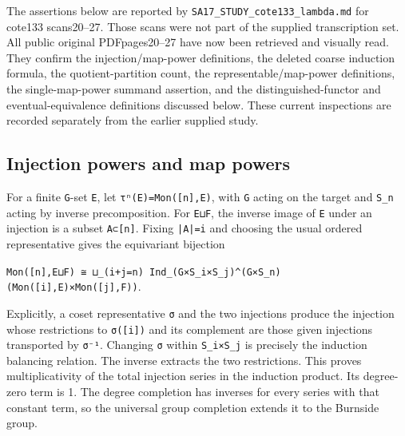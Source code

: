 \documentclass[
  10pt,
]{article}
\begin{document}
The assertions below are reported by
\texttt{\small SA17\_\allowbreak{}STUDY\_\allowbreak{}cote133\_\allowbreak{}lambda.md}
for cote133 scans20--27. Those scans were not part of the supplied
transcription set. All public original PDFpages20--27 have now been
retrieved and visually read. They confirm the injection/map-power
definitions, the deleted coarse induction formula, the
quotient-partition count, the representable/map-power definitions, the
single-map-power summand assertion, and the distinguished-functor and
eventual-equivalence definitions discussed below. These current
inspections are recorded separately from the earlier supplied study.

\subsection{Injection powers and map
powers}\label{injection-powers-and-map-powers}

For a finite \texttt{\small G}-set \texttt{\small E}, let
\texttt{\small τⁿ(\allowbreak{}E)\allowbreak{}=\allowbreak{}Mon(\allowbreak{}[\allowbreak{}n]\allowbreak{},\allowbreak{}E)\allowbreak{}},
with \texttt{\small G} acting on the target and
\texttt{\small S\_\allowbreak{}n} acting by inverse precomposition. For
\texttt{\small E⊔F}, the inverse image of \texttt{\small E} under an
injection is a subset \texttt{\small A⊂[\allowbreak{}n]\allowbreak{}}.
Fixing \texttt{\small |A|=\allowbreak{}i} and choosing the usual ordered
representative gives the equivariant bijection

\texttt{\small Mon(\allowbreak{}[\allowbreak{}n]\allowbreak{},\allowbreak{}E⊔F)\allowbreak{} ≅ ⊔\_\allowbreak{}(\allowbreak{}i+\allowbreak{}j=\allowbreak{}n)\allowbreak{} Ind\_\allowbreak{}(\allowbreak{}G×S\_\allowbreak{}i×S\_\allowbreak{}j)\allowbreak{}\textasciicircum{}(\allowbreak{}G×S\_\allowbreak{}n)\allowbreak{}(\allowbreak{}Mon(\allowbreak{}[\allowbreak{}i]\allowbreak{},\allowbreak{}E)\allowbreak{}×Mon(\allowbreak{}[\allowbreak{}j]\allowbreak{},\allowbreak{}F)\allowbreak{})\allowbreak{}}.

Explicitly, a coset representative \texttt{\small σ} and the two
injections produce the injection whose restrictions to
\texttt{\small σ(\allowbreak{}[\allowbreak{}i]\allowbreak{})\allowbreak{}}
and its complement are those given injections transported by
\texttt{\small σ⁻¹}. Changing \texttt{\small σ} within
\texttt{\small S\_\allowbreak{}i×S\_\allowbreak{}j} is precisely the
induction balancing relation. The inverse extracts the two restrictions.
This proves multiplicativity of the total injection series in the
induction product. Its degree-zero term is 1. The degree completion has
inverses for every series with that constant term, so the universal
group completion extends it to the Burnside group.
\end{document}
